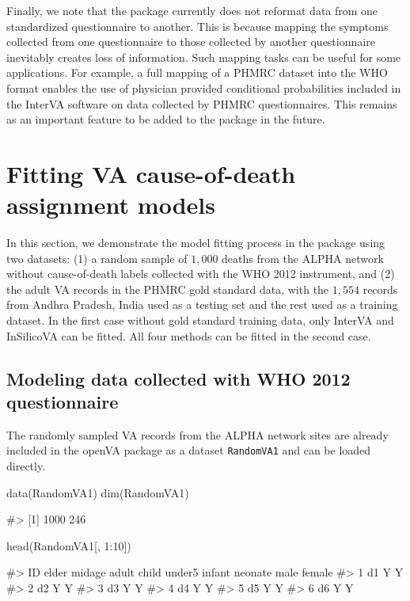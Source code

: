 Finally, we note that the  package currently does not
reformat data from one standardized questionnaire to another. This is
because mapping the symptoms collected from one questionnaire to those
collected by another questionnaire inevitably creates loss of
information. Such mapping tasks can be useful for some applications. For
example, a full mapping of a PHMRC dataset into the WHO format enables
the use of physician provided conditional probabilities included in the
InterVA software on data collected by PHMRC questionnaires. This remains
as an important feature to be added to the package in the future.

\hypertarget{fitting-va-cause-of-death-assignment-models}{%
\section{Fitting VA cause-of-death assignment
models}\label{fitting-va-cause-of-death-assignment-models}}

In this section, we demonstrate the model fitting process in the
 package using two datasets: (1) a random sample of
\(1,000\) deaths from the ALPHA network without cause-of-death labels
collected with the WHO 2012 instrument, and (2) the adult VA records in
the PHMRC gold standard data, with the \(1,554\) records from Andhra
Pradesh, India used as a testing set and the rest used as a training
dataset. In the first case without gold standard training data, only
InterVA and InSilicoVA can be fitted. All four methods can be fitted in
the second case.

\hypertarget{modeling-data-collected-with-who-2012-questionnaire}{%
\subsection{Modeling data collected with WHO 2012
questionnaire}\label{modeling-data-collected-with-who-2012-questionnaire}}

The randomly sampled VA records from the ALPHA network sites are already
included in the openVA package as a dataset \texttt{RandomVA1} and can
be loaded directly.

\begin{Schunk}
\begin{Sinput}
data(RandomVA1)
dim(RandomVA1)
\end{Sinput}
\begin{Soutput}
#> [1] 1000  246
\end{Soutput}
\begin{Sinput}
head(RandomVA1[, 1:10])
\end{Sinput}
\begin{Soutput}
#>   ID elder midage adult child under5 infant neonate male female
#> 1 d1     Y                                             Y       
#> 2 d2     Y                                                    Y
#> 3 d3            Y                                      Y       
#> 4 d4                  Y                                       Y
#> 5 d5                  Y                                Y       
#> 6 d6                  Y                                       Y
\end{Soutput}
\end{Schunk}

